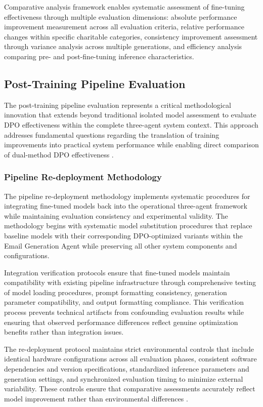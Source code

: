 Comparative analysis framework enables systematic assessment of fine-tuning effectiveness through multiple evaluation dimensions: absolute performance improvement measurement across all evaluation criteria, relative performance changes within specific charitable categories, consistency improvement assessment through variance analysis across multiple generations, and efficiency analysis comparing pre- and post-fine-tuning inference characteristics.

\subsection{Post-Training Pipeline Evaluation}
\label{sec:post-training-pipeline}

The post-training pipeline evaluation represents a critical methodological innovation that extends beyond traditional isolated model assessment to evaluate DPO effectiveness within the complete three-agent system context. This approach addresses fundamental questions regarding the translation of training improvements into practical system performance while enabling direct comparison of dual-method DPO effectiveness \cite{chen2024meta_evaluation, wang2024dynamic_evaluation}.

\subsubsection{Pipeline Re-deployment Methodology}

The pipeline re-deployment methodology implements systematic procedures for integrating fine-tuned models back into the operational three-agent framework while maintaining evaluation consistency and experimental validity. The methodology begins with systematic model substitution procedures that replace baseline models with their corresponding DPO-optimized variants within the Email Generation Agent while preserving all other system components and configurations.

Integration verification protocols ensure that fine-tuned models maintain compatibility with existing pipeline infrastructure through comprehensive testing of model loading procedures, prompt formatting consistency, generation parameter compatibility, and output formatting compliance. This verification process prevents technical artifacts from confounding evaluation results while ensuring that observed performance differences reflect genuine optimization benefits rather than integration issues.

The re-deployment protocol maintains strict environmental controls that include identical hardware configurations across all evaluation phases, consistent software dependencies and version specifications, standardized inference parameters and generation settings, and synchronized evaluation timing to minimize external variability. These controls ensure that comparative assessments accurately reflect model improvement rather than environmental differences \cite{zhang2024improve_pipeline}.

